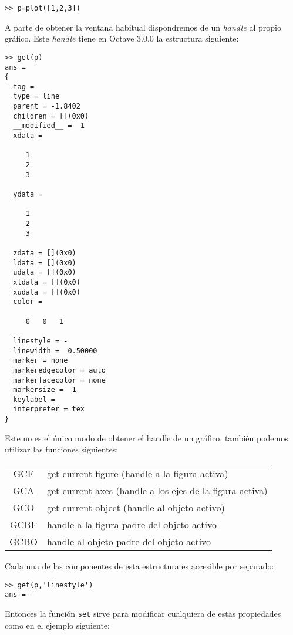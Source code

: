 \begin{verbatim}
>> p=plot([1,2,3])
\end{verbatim}

A parte de obtener la ventana habitual dispondremos de un
\emph{handle} al propio gráfico.  Este \emph{handle} tiene en Octave
3.0.0 la estructura siguiente:

\begin{verbatim}
>> get(p)
ans =
{
  tag =
  type = line
  parent = -1.8402
  children = [](0x0)
  __modified__ =  1
  xdata =

     1
     2
     3

  ydata =

     1
     2
     3

  zdata = [](0x0)
  ldata = [](0x0)
  udata = [](0x0)
  xldata = [](0x0)
  xudata = [](0x0)
  color =

     0   0   1

  linestyle = -
  linewidth =  0.50000
  marker = none
  markeredgecolor = auto
  markerfacecolor = none
  markersize =  1
  keylabel =
  interpreter = tex
}
\end{verbatim}

Este no es el único modo de obtener el handle de un gráfico, también
podemos utilizar las funciones siguientes:

\begin{center}
\begin{tabular}{cl}
GCF & get current figure (handle a la figura activa)\\
GCA & get current axes (handle a los ejes de la figura activa) \\
GCO & get current object (handle al objeto activo) \\
GCBF & handle a la figura padre del objeto activo\\
GCBO & handle al objeto padre del objeto activo\\
\end{tabular}
\end{center}


Cada una de las componentes de esta estructura es accesible por
separado:

\begin{verbatim}
>> get(p,'linestyle')
ans = -
\end{verbatim}

Entonces la función \texttt{set} sirve para modificar cualquiera de
estas propiedades como en el ejemplo siguiente:

\begin{verbatim}

\end{verbatim}
